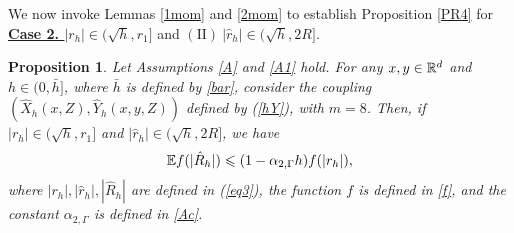\documentclass[aap]{imsart}
\theoremstyle{plain}
\newtheorem{proposition}{Proposition}
\theoremstyle{definition}
\begin{document}
We now invoke Lemmas \ref{1mom} and \ref{2mom} to establish Proposition \ref{PR4} for \underline{\bf{Case 2. \textit{ $|r_h|\in(\sqrt{h}, r_1]$}}} and \underline{$(\mathrm{II})~|\hat{r}_h|\in(\sqrt{h}, 2R]$}.
\begin{proposition}\label{PR3}
Let Assumptions \ref{A} and \ref{A1} hold. For any $x, y\in\mathbb{R}^d$ and $h \in (0, \bar{h}]$, where $\bar{h}$ is defined by \eqref{bar}, consider the coupling $(\hat{X}_h(x,Z), \hat{Y}_h(x,y,Z))$ defined by (\ref{hY}), with $m=8$. Then, if $|r_h|\in(\sqrt{h}, r_1]$ and $|\hat{r}_h|\in (\sqrt{h}, 2R]$, we have
\begin{equation*}
\mathbb{E} f(|\hat{R}_h|)\leqslant (1-\alpha_{2, \Gamma}h)f(|r_h|),
\end{equation*}
where $|r_h|, |\hat{r}_h|, |\hat{R}_h|$ are defined in (\ref{eq3}), the function
$f$ is defined in \eqref{f}, and the constant $\alpha_{2,\Gamma}$ is
defined in \eqref{Ac}.
\end{proposition}
\end{document}

